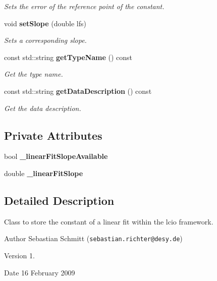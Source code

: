 \begin{DoxyCompactItemize}
\begin{DoxyCompactList}\small\item\em Sets the error of the reference point of the constant. \end{DoxyCompactList}\item 
void {\bf set\-Slope} (double lfs)
\begin{DoxyCompactList}\small\item\em Sets a corresponding slope. \end{DoxyCompactList}\item 
const std\-::string {\bf get\-Type\-Name} () const 
\begin{DoxyCompactList}\small\item\em Get the type name. \end{DoxyCompactList}\item 
const std\-::string {\bf get\-Data\-Description} () const 
\begin{DoxyCompactList}\small\item\em Get the data description. \end{DoxyCompactList}\end{DoxyCompactItemize}
\subsection*{Private Attributes}
\begin{DoxyCompactItemize}
\item 
bool {\bfseries \-\_\-linear\-Fit\-Slope\-Available}\label{classCALICE_1_1LinearFitConstant_a9e340a4dfbc49f5664a348ea97bf7c5a}

\item 
double {\bfseries \-\_\-linear\-Fit\-Slope}\label{classCALICE_1_1LinearFitConstant_aa335a19743f509655fe5bf8a00563a82}

\end{DoxyCompactItemize}


\subsection{Detailed Description}
Class to store the constant of a linear fit within the lcio framework. 

\begin{DoxyAuthor}{Author}
Sebastian Schmitt ({\tt sebastian.\-richter@desy.\-de}) 
\end{DoxyAuthor}
\begin{DoxyVersion}{Version}
1. 
\end{DoxyVersion}
\begin{DoxyDate}{Date}
16 February 2009 
\end{DoxyDate}



